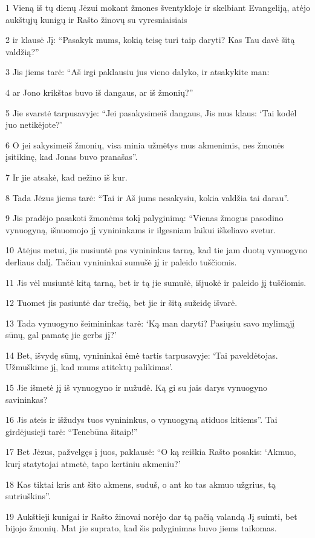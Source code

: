 \par 1 Vieną iš tų dienų Jėzui mokant žmones šventykloje ir skelbiant Evangeliją, atėjo aukštųjų kunigų ir Rašto žinovų su vyresniaisiais 
\par 2 ir klausė Jį: “Pasakyk mums, kokią teisę turi taip daryti? Kas Tau davė šitą valdžią?” 
\par 3 Jis jiems tarė: “Aš irgi paklausiu jus vieno dalyko, ir atsakykite man: 
\par 4 ar Jono krikštas buvo iš dangaus, ar iš žmonių?” 
\par 5 Jie svarstė tarpusavyje: “Jei pasakysime­iš dangaus, Jis mus klaus: ‘Tai kodėl juo netikėjote?’ 
\par 6 O jei sakysime­iš žmonių, visa minia užmėtys mus akmenimis, nes žmonės įsitikinę, kad Jonas buvo pranašas”. 
\par 7 Ir jie atsakė, kad nežino iš kur. 
\par 8 Tada Jėzus jiems tarė: “Tai ir Aš jums nesakysiu, kokia valdžia tai darau”. 
\par 9 Jis pradėjo pasakoti žmonėms tokį palyginimą: “Vienas žmogus pasodino vynuogyną, išnuomojo jį vynininkams ir ilgesniam laikui iškeliavo svetur. 
\par 10 Atėjus metui, jis nusiuntė pas vynininkus tarną, kad tie jam duotų vynuogyno derliaus dalį. Tačiau vynininkai sumušė jį ir paleido tuščiomis. 
\par 11 Jis vėl nusiuntė kitą tarną, bet ir tą jie sumušė, išjuokė ir paleido jį tuščiomis. 
\par 12 Tuomet jis pasiuntė dar trečią, bet jie ir šitą sužeidę išvarė. 
\par 13 Tada vynuogyno šeimininkas tarė: ‘Ką man daryti? Pasiųsiu savo mylimąjį sūnų, gal pamatę jie gerbs jį?’ 
\par 14 Bet, išvydę sūnų, vynininkai ėmė tartis tarpusavyje: ‘Tai paveldėtojas. Užmuškime jį, kad mums atitektų palikimas’. 
\par 15 Jie išmetė jį iš vynuogyno ir nužudė. Ką gi su jais darys vynuogyno savininkas? 
\par 16 Jis ateis ir išžudys tuos vynininkus, o vynuogyną atiduos kitiems”. Tai girdėjusieji tarė: “Tenebūna šitaip!” 
\par 17 Bet Jėzus, pažvelgęs į juos, paklausė: “O ką reiškia Rašto posakis: ‘Akmuo, kurį statytojai atmetė, tapo kertiniu akmeniu?’ 
\par 18 Kas tiktai kris ant šito akmens, suduš, o ant ko tas akmuo užgrius, tą sutriuškins”. 
\par 19 Aukštieji kunigai ir Rašto žinovai norėjo dar tą pačią valandą Jį suimti, bet bijojo žmonių. Mat jie suprato, kad šis palyginimas buvo jiems taikomas. 
